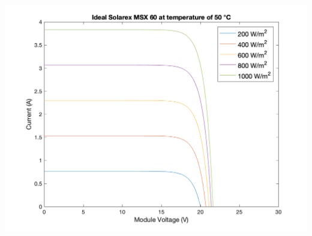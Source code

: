 \documentclass[fleqn]{article}
\begin{document}
\begin{enumerate}
\begin{center}
  \end{center}
  \begin{center}
    \includegraphics[width=0.9\linewidth]{50C-i.png}
  \end{center}
  

\end{enumerate}
\end{document}

